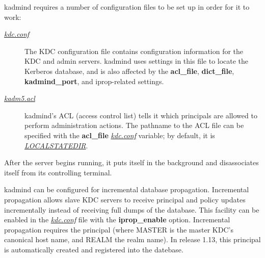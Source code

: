 \documentclass[letterpaper,10pt,english]{sphinxmanual}
\begin{document}
kadmind requires a number of configuration files to be set up in order
for it to work:
\begin{description}
\item[{{\hyperref[admin/conf_files/kdc_conf:kdc-conf-5]{\emph{kdc.conf}}}}] \leavevmode
The KDC configuration file contains configuration information for
the KDC and admin servers.  kadmind uses settings in this file to
locate the Kerberos database, and is also affected by the
\textbf{acl\_file}, \textbf{dict\_file}, \textbf{kadmind\_port}, and iprop-related
settings.

\item[{{\hyperref[admin/conf_files/kadm5_acl:kadm5-acl-5]{\emph{kadm5.acl}}}}] \leavevmode
kadmind's ACL (access control list) tells it which principals are
allowed to perform administration actions.  The pathname to the
ACL file can be specified with the \textbf{acl\_file} {\hyperref[admin/conf_files/kdc_conf:kdc-conf-5]{\emph{kdc.conf}}}
variable; by default, it is {\hyperref[mitK5defaults:paths]{\emph{LOCALSTATEDIR}}}.

\end{description}

After the server begins running, it puts itself in the background and
disassociates itself from its controlling terminal.

kadmind can be configured for incremental database propagation.
Incremental propagation allows slave KDC servers to receive principal
and policy updates incrementally instead of receiving full dumps of
the database.  This facility can be enabled in the {\hyperref[admin/conf_files/kdc_conf:kdc-conf-5]{\emph{kdc.conf}}}
file with the \textbf{iprop\_enable} option.  Incremental propagation
requires the principal  (where MASTER is the
master KDC's canonical host name, and REALM the realm name).  In
release 1.13, this principal is automatically created and registered
into the datebase.
\end{document}
